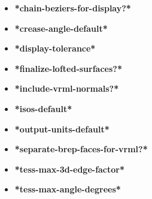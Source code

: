 \documentclass [11pt]{book}
\begin{document}
\begin{itemize}
\item {}
\label{prim:*chain-beziers-for-display?*}
\textbf{*chain-beziers-for-display?*}





\item {}
\label{prim:*crease-angle-default*}
\textbf{*crease-angle-default*}





\item {}
\label{prim:*display-tolerance*}
\textbf{*display-tolerance*}





\item {}
\label{prim:*finalize-lofted-surfaces?*}
\textbf{*finalize-lofted-surfaces?*}





\item {}
\label{prim:*include-vrml-normals?*}
\textbf{*include-vrml-normals?*}





\item {}
\label{prim:*isos-default*}
\textbf{*isos-default*}





\item {}
\label{prim:*output-units-default*}
\textbf{*output-units-default*}





\item {}
\label{prim:*separate-brep-faces-for-vrml?*}
\textbf{*separate-brep-faces-for-vrml?*}





\item {}
\label{prim:*tess-max-3d-edge-factor*}
\textbf{*tess-max-3d-edge-factor*}





\item {}
\label{prim:*tess-max-angle-degrees*}
\textbf{*tess-max-angle-degrees*}






\end{itemize}
\end{document}

